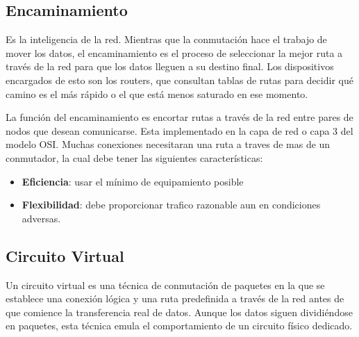 \subsection{Encaminamiento}

Es la inteligencia de la red. Mientras que la conmutación hace el trabajo de mover los datos, el encaminamiento es el proceso de seleccionar la mejor ruta a través de la red para que los datos lleguen a su destino final. Los dispositivos encargados de esto son los routers, que consultan tablas de rutas para decidir qué camino es el más rápido o el que está menos saturado en ese momento.

La función del encaminamiento es encortar rutas a través de la red entre pares de nodos que desean comunicarse. Esta implementado en la capa de red o capa 3 del modelo OSI. Muchas conexiones necesitaran una ruta a traves de mas de un conmutador, la cual debe tener las siguientes características:

\begin{itemize}
	\item \textbf{Eficiencia}: usar el mínimo de equipamiento posible
	\item \textbf{Flexibilidad}: debe proporcionar trafico razonable aun en condiciones adversas.
\end{itemize}

\subsection{Circuito Virtual}

Un circuito virtual es una técnica de conmutación de paquetes en la que se establece una conexión lógica y una ruta predefinida a través de la red antes de que comience la transferencia real de datos. Aunque los datos siguen dividiéndose en paquetes, esta técnica emula el comportamiento de un circuito físico dedicado.